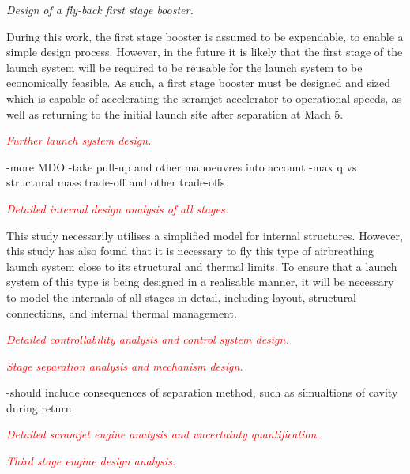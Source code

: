 \vspace{10pt}
 \textit{Design of a fly-back first stage booster.}
 
 \noindent
 During this work, the first stage booster is assumed to be expendable, to enable a simple design process. However, in the future it is likely that the first stage of the launch system will be required to be reusable for the launch system to be economically feasible. As such, a first stage booster must be designed and sized which is capable of accelerating the scramjet accelerator to operational speeds, as well as returning to the initial launch site after separation at Mach 5. 

\vspace{10pt}
\textcolor{red}{
	\textit{Further launch system design.}
}

\noindent
-more MDO
-take pull-up and other manoeuvres into account
-max q vs structural mass trade-off and other trade-offs

\vspace{10pt}
\textcolor{red}{
\textit{Detailed internal design analysis of all stages.}
}

\noindent
This study necessarily utilises a simplified model for internal structures. However, this study has also found that it is necessary to fly this type of airbreathing launch system close to its structural and thermal limits. To ensure that a launch system of this type is being designed in a realisable manner, it will be necessary to model the internals of all stages in detail, including layout, structural connections, and internal thermal management.  

\vspace{10pt}
\textcolor{red}{
	\textit{Detailed controllability analysis and control system design.}
}

\noindent

\vspace{10pt}
\textcolor{red}{
	\textit{Stage separation analysis and mechanism design.}
}

\noindent

-should include consequences of separation method, such as simualtions of cavity during return

\vspace{10pt}
\textcolor{red}{
	\textit{Detailed scramjet engine analysis and uncertainty quantification.}
}

\noindent

\vspace{10pt}
\textcolor{red}{
	\textit{Third stage engine design analysis.}
}

